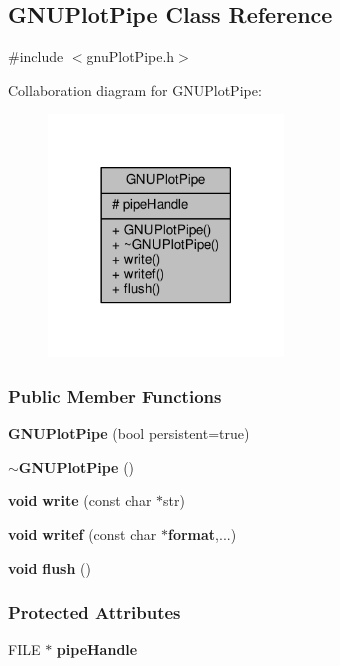 \subsection{G\+N\+U\+Plot\+Pipe Class Reference}
\label{classGNUPlotPipe}


{\ttfamily \#include $<$gnu\+Plot\+Pipe.\+h$>$}



Collaboration diagram for G\+N\+U\+Plot\+Pipe\+:
\nopagebreak
\begin{figure}[H]
\begin{center}
\leavevmode
\includegraphics[width=177pt]{df/d37/classGNUPlotPipe__coll__graph}
\end{center}
\end{figure}
\subsubsection*{Public Member Functions}
\begin{DoxyCompactItemize}
\item 
{\bf G\+N\+U\+Plot\+Pipe} (bool persistent=true)
\item 
{\bf $\sim$\+G\+N\+U\+Plot\+Pipe} ()
\item 
{\bf void} {\bf write} (const char $\ast$str)
\item 
{\bf void} {\bf writef} (const char $\ast${\bf format},...)
\item 
{\bf void} {\bf flush} ()
\end{DoxyCompactItemize}
\subsubsection*{Protected Attributes}
\begin{DoxyCompactItemize}
\item 
F\+I\+LE $\ast$ {\bf pipe\+Handle}
\end{DoxyCompactItemize}


